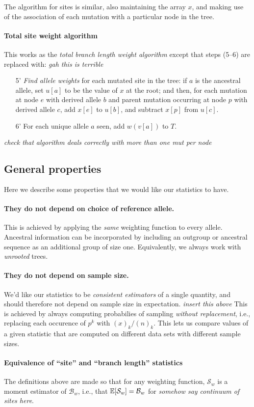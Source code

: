 \documentclass{article}
\newcommand{\branch}{\mathcal{B}} %
\newcommand{\site}{\mathcal{S}} %
\newcommand{\plr}[1]{{\color{blue} \it #1}}
\begin{document}
The algorithm for sites is similar, also maintaining the array $x$,
and making use of the association of each mutation with a particular node in the tree.

\paragraph{Total site weight algorithm}
This works as the \emph{total branch length weight algorithm} except that steps (5--6) are replaced with:
\plr{gah this is terrible}
\begin{itemize}
    \item[5'] \emph{Find allele weights} for each mutated site in the tree:
        if $a$ is the ancestral allele,
        set $u[a]$ to be the value of $x$ at the root; and then,
        for each mutation at node $e$ with derived allele $b$
        and parent mutation occurring at node $p$ with derived allele $c$,
        add $x[e]$ to $u[b]$, and subtract $x[p]$ from $u[c]$.
    \item[6'] For each unique allele $a$ seen,
        add $w(v[a])$ to $T$.
\end{itemize}
\plr{check that algorithm deals correctly with more than one mut per node}

\subsection*{General properties}

Here we describe some properties that we would like our statistics to have.

\paragraph{They do not depend on choice of reference allele.}
This is achieved by applying the \emph{same} weighting function to every allele.
Ancestral information can be incorporated by including an outgroup or ancestral sequence
as an additional group of size one.
Equivalently, we always work with \emph{unrooted} trees.

\paragraph{They do not depend on sample size.}
We'd like our statistics to be \emph{consistent estimators}
of a single quantity, and should therefore not depend on sample size in expectation.
\plr{insert this above}
This is achieved by always computing probabilies of sampling \emph{without replacement},
i.e., replacing each occurence of $p^k$ with $(x)_k/(n)_k$.
This lets us compare values of a given statistic
that are computed on different data sets with different sample sizes.

\paragraph{Equivalence of ``site'' and ``branch length'' statistics}
The definitions above are made so that for any weighting function,
$\site_w$ is a moment estimator of $\branch_w$, i.e.,
that $\E[\site_w] = \branch_w$ for \plr{somehow say continuum of sites here}.
\end{document}
